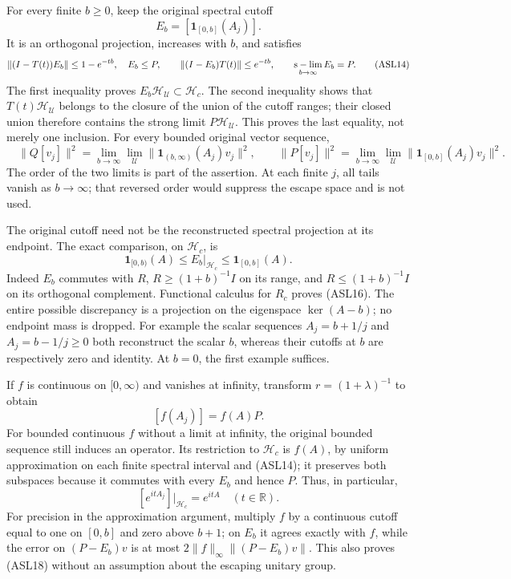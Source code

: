 \documentclass[11pt]{article}
\begin{document}
For every finite \(b\ge0\), keep the original spectral cutoff
\[
 E_b=[\mathbf1_{[0,b]}(A_j)].
 \tag{ASL13}
\]
It is an orthogonal projection, increases with \(b\), and satisfies
\[
 \|(I-T(t))E_b\|\le1-e^{-tb},\quad E_b\le P,\qquad
 \|(I-E_b)T(t)\|\le e^{-tb},\qquad
 \mathop{\rm s-lim}_{b\to\infty}E_b=P.
 \tag{ASL14}
\]
The first inequality proves \(E_b\mathcal H_{\mathcal U}\subset\mathcal H_c\). The second inequality shows that \(T(t)\mathcal H_{\mathcal U}\) belongs to the closure of the union of the cutoff ranges; their closed union therefore contains the strong limit \(P\mathcal H_{\mathcal U}\). This proves the last equality, not merely one inclusion. For every bounded original vector sequence,
\[
 \boxed{\quad
 \|Q[v_j]\|^2=\lim_{b\to\infty}\lim_{\mathcal U}
       \|\mathbf1_{(b,\infty)}(A_j)v_j\|^2,
 \qquad
 \|P[v_j]\|^2=\lim_{b\to\infty}\lim_{\mathcal U}
       \|\mathbf1_{[0,b]}(A_j)v_j\|^2 .\quad}
 \tag{ASL15}
\]
The order of the two limits is part of the assertion. At each finite \(j\), all tails vanish as \(b\to\infty\); that reversed order would suppress the escape space and is not used.

The original cutoff need not be the reconstructed spectral projection at its endpoint. The exact comparison, on \(\mathcal H_c\), is
\[
 \mathbf1_{[0,b)}(A)\le E_b|_{\mathcal H_c}
 \le\mathbf1_{[0,b]}(A).
 \tag{ASL16}
\]
Indeed \(E_b\) commutes with \(R\), \(R\ge(1+b)^{-1}I\) on its range, and \(R\le(1+b)^{-1}I\) on its orthogonal complement. Functional calculus for \(R_c\) proves (ASL16). The entire possible discrepancy is a projection on the eigenspace \(\ker(A-b)\); no endpoint mass is dropped. For example the scalar sequences \(A_j=b+1/j\) and \(A_j=b-1/j\ge0\) both reconstruct the scalar \(b\), whereas their cutoffs at \(b\) are respectively zero and identity. At \(b=0\), the first example suffices.

If \(f\) is continuous on \([0,\infty)\) and vanishes at infinity, transform \(r=(1+\lambda)^{-1}\) to obtain
\[
 [f(A_j)]=f(A)P.
 \tag{ASL17}
\]
For bounded continuous \(f\) without a limit at infinity, the original bounded sequence still induces an operator. Its restriction to \(\mathcal H_c\) is \(f(A)\), by uniform approximation on each finite spectral interval and (ASL14); it preserves both subspaces because it commutes with every \(E_b\) and hence \(P\). Thus, in particular,
\[
 [e^{itA_j}]|_{\mathcal H_c}=e^{itA}\quad(t\in\mathbb R).
 \tag{ASL18}
\]
For precision in the approximation argument, multiply \(f\) by a continuous cutoff equal to one on \([0,b]\) and zero above \(b+1\); on \(E_b\) it agrees exactly with \(f\), while the error on \((P-E_b)v\) is at most \(2\|f\|_\infty\|(P-E_b)v\|\). This also proves (ASL18) without an assumption about the escaping unitary group.
\end{document}
